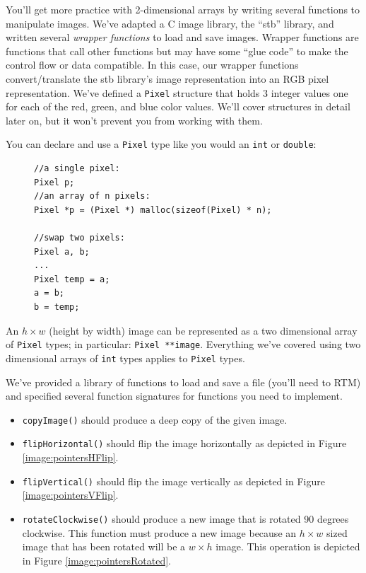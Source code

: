 \documentclass[12pt]{scrartcl}
\begin{document}
You'll get more practice with 2-dimensional arrays by writing several
functions to manipulate images.  We've adapted a C image library, the 
``stb'' library, and written several \emph{wrapper functions} to load
and save images.  Wrapper functions are functions that call other
functions but may have some ``glue code'' to make the control flow or
data compatible.  In this case, our wrapper functions convert/translate
the stb library's image representation into an RGB pixel representation.
We've defined a \texttt{Pixel} structure that holds 3 integer
values one for each of the red, green, and blue color values.  We'll
cover structures in detail later on, but it won't prevent you from working
with them.  

You can declare and use a \texttt{Pixel} type like you would 
an \texttt{int} or \texttt{double}: 

\begin{figure}[H]
\begin{verbatim}
//a single pixel:
Pixel p;
//an array of n pixels:
Pixel *p = (Pixel *) malloc(sizeof(Pixel) * n);

//swap two pixels:
Pixel a, b;
...
Pixel temp = a;
a = b;
b = temp;
\end{verbatim} 
\end{figure}

An $h \times w$ (height by width) image can be represented as a two dimensional
array of \texttt{Pixel} types; in particular: \texttt{Pixel **image}.
Everything we've covered using two dimensional arrays of \texttt{int} types
applies to \texttt{Pixel} types.

We've provided a library of functions to load and save a file (you'll need to 
RTM) and specified several function signatures for functions you need to
implement.  
\begin{itemize}
  \item \texttt{copyImage()} should produce a deep copy of the given
  image.

  \item \texttt{flipHorizontal()} should flip the image horizontally
  as depicted in Figure \ref{image:pointersHFlip}.  

  \item \texttt{flipVertical()} should flip the image vertically as
  depicted in Figure \ref{image:pointersVFlip}.

  \item \texttt{rotateClockwise()} should produce a new image that
  is rotated 90 degrees clockwise.  This function must produce a new image
  because an $h \times w$ sized image that has been rotated will be a 
  $w \times h$ image.  This operation is depicted in Figure \ref{image:pointersRotated}.

\end{itemize}  
\end{document}
